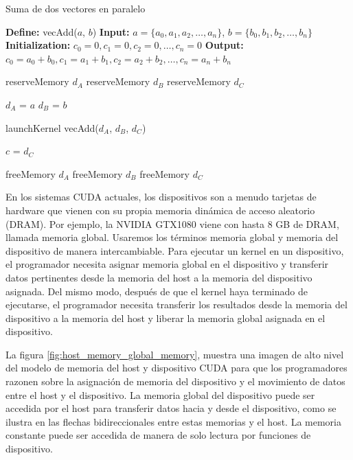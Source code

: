 \begin{algorithm}
\caption{Suma de dos vectores en paralelo}
  \begin{algorithmic}[1]
  \Statex \textbf{Define:} vecAdd($a$, $b$)
  \Statex \textbf{Input:} $a = \{a_0, a_1, a_2, \ldots, a_n\}$, $b = \{b_0, b_1, b_2, \ldots, b_n\}$
  \Statex \textbf{Initialization:} $c_0 = 0, c_1 = 0, c_2 = 0, \ldots, c_n = 0$
  \Statex \textbf{Output:} $c_0 = a_0 + b_0, c_1 = a_1 + b_1, c_2 = a_2 + b_2, \ldots, c_n = a_n + b_n$

  \Statex reserveMemory $d_A$
  \Statex reserveMemory $d_B$
  \Statex reserveMemory $d_C$

  \Statex $d_A$ = $a$
  \Statex $d_B$ = $b$

  \Statex launchKernel vecAdd($d_A$, $d_B$, $d_C$)

  \Statex $c$ = $d_C$

  \Statex freeMemory $d_A$
  \Statex freeMemory $d_B$
  \Statex freeMemory $d_C$
\end{algorithmic}
\end{algorithm}

En los sistemas CUDA actuales, los dispositivos son a menudo tarjetas de hardware que vienen con su propia memoria
dinámica de acceso aleatorio (DRAM). Por ejemplo, la NVIDIA GTX1080 viene con hasta 8 GB de DRAM, llamada memoria
global. Usaremos los términos memoria global y memoria del dispositivo de manera intercambiable. Para ejecutar un kernel
en un dispositivo, el programador necesita asignar memoria global en el dispositivo y transferir datos pertinentes desde
la memoria del host a la memoria del dispositivo asignada. Del mismo modo, después de que el kernel haya terminado de
ejecutarse, el programador necesita transferir los resultados desde la memoria del dispositivo a la memoria del host y
liberar la memoria global asignada en el dispositivo.

La figura \ref{fig:host_memory_global_memory}, muestra una imagen de alto nivel del modelo de memoria del host y
dispositivo CUDA para que los programadores razonen sobre la asignación de memoria del dispositivo y el movimiento de
datos entre el host y el dispositivo. La memoria global del dispositivo puede ser accedida por el host para transferir
datos hacia y desde el dispositivo, como se ilustra en las flechas bidireccionales entre estas memorias y el host. La
memoria constante puede ser accedida de manera de solo lectura por funciones de dispositivo.

